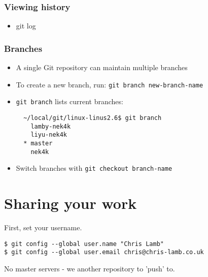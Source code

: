\documentclass{beamer}
\begin{document}
\begin{frame}[fragile]
    \frametitle{Viewing history}

    \begin{itemize}
        \item \alert{git log}
    \end{itemize}
\end{frame}



\begin{frame}[fragile]
    \frametitle{Branches}

    \begin{itemize}
        \item A single Git repository can maintain multiple branches
        \item To create a new branch, run: \verb#git branch new-branch-name#
        \item \verb#git branch# lists current branches:

    \begin{verbatim}
  ~/local/git/linux-linus2.6$ git branch
    lamby-nek4k
    liyu-nek4k
  * master
    nek4k\end{verbatim}
        \item Switch branches with \verb#git checkout branch-name#
    \end{itemize}

\end{frame}




\section{Sharing your work}

\begin{frame}[fragile]
    First, set your username.

    \begin{verbatim}
$ git config --global user.name "Chris Lamb"
$ git config --global user.email chris@chris-lamb.co.uk
    \end{verbatim}
\end{frame}

\begin{frame}[fragile]
    No master servers - we another repository to 'push' to.


    \begin{verbatim}
    \end{verbatim}
\end{frame}
\end{document}

